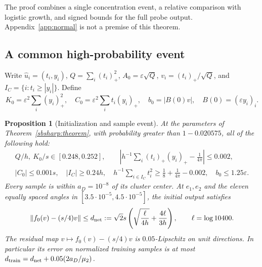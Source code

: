 \documentclass[10pt]{article}
\newtheorem{proposition}[theorem]{Proposition}
\theoremstyle{remark}\newtheorem{remark}[theorem]{Remark}
\begin{document}
The proof combines a single concentration event, a relative comparison with
logistic growth, and signed bounds for the full probe output.
Appendix~\ref{app:normal} is not a premise of this theorem.

\subsection{A common high-probability event}
Write $\widehat u_i=(t_i,y_i)$, $Q=\sum_i(t_i)_+^2$,
$A_0=\varepsilon\sqrt Q$, $v_i=(t_i)_+/\sqrt Q$, and
$I_C=\{i:t_i\ge|y_i|\}$. Define
\[
 K_0=\varepsilon^2\sum_i(y_i)_+^2,\quad
 C_0=\varepsilon^2\sum_i t_i(y_i)_+,\quad b_0=|B(0)v|,
 \quad B(0)=(\varepsilon y_i)_i.
\]
\begin{proposition}[Initialization and sample event]\label{prop:good-event}
At the parameters of Theorem~\ref{sbsharp:theorem}, with probability greater
than $1-0.020575$, all of the following hold:
\begin{gather}\label{eq:good-moments}
 Q/h,\ K_0/s\in[0.248,0.252],\qquad
 \left|h^{-1}\sum_i(t_i)_+(y_i)_+-\frac1{4\pi}\right|\le0.002,\\
 |C_0|\le0.001s,\quad |I_C|\ge0.24h,\quad
 h^{-1}\sum_{i\in I_C}t_i^2\ge\frac18+\frac1{4\pi}-0.002,
 \quad b_0\le1.25\varepsilon.\nonumber
\end{gather}
Every sample is within $a_D=10^{-8}$ of its cluster center.
At $e_1,e_2$ and the eleven equally spaced angles in
$[3.5\cdot10^{-5},4.5\cdot10^{-5}]$, the initial output satisfies
\begin{equation}\label{eq:good-net}
 \|f_0(v)-(s/4)v\|\le d_{\rm net}:=
 \sqrt2s\left(\sqrt{\frac{\ell}{4h}}+\frac{4\ell}{3h}\right),
 \qquad \ell=\log10400.
\end{equation}
The residual map $v\mapsto f_0(v)-(s/4)v$ is $0.05$-Lipschitz on
unit directions. In particular its error on normalized training samples
is at most $d_{\rm train}=d_{\rm net}+0.05(2a_D/\mu_2)$.
\end{proposition}
\end{document}
